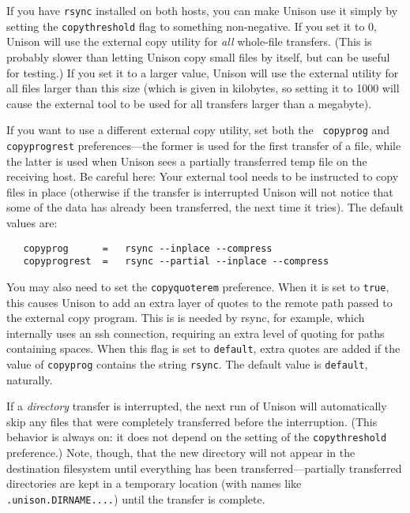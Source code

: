 \documentclass{article}
\begin{document}
If you have {\tt rsync} installed on both hosts, you can make Unison use it
simply by setting the {\tt copythreshold} flag to something non-negative.
If you set it to 0, Unison will use the external copy utility for {\em all}
whole-file transfers.  (This is probably slower than letting Unison copy
small files by itself, but can be useful for testing.)  If you set it to a
larger value, Unison will use the external utility for all files larger than
this size (which is given in kilobytes, so setting it to 1000 will cause the
external tool to be used for all transfers larger than a megabyte).

If you want to use a different external copy utility, set both the {\tt
  copyprog} and {\tt copyprogrest} preferences---the former is used for
the first transfer of a file, while the latter is used when Unison sees a
partially transferred temp file on the receiving host.  Be careful here:
Your external tool needs to be instructed to copy files in place (otherwise
if the transfer is interrupted Unison will not notice that some of the data
has already been transferred, the next time it tries).  The default values
are:
\begin{verbatim}
   copyprog      =   rsync --inplace --compress
   copyprogrest  =   rsync --partial --inplace --compress
\end{verbatim}
You may also need to set the {\tt copyquoterem} preference.  When it is set
to {\tt true}, this causes Unison to add an extra layer of quotes to
the remote path passed to the external copy program. This is is needed by
rsync, for example, which internally uses an ssh connection, requiring an
extra level of quoting for paths containing spaces. When this flag is set to
{\tt default}, extra quotes are added if the value of {\tt copyprog}
contains the string {\tt rsync}.  The default value is {\tt default},
naturally.

If a {\em directory} transfer is interrupted, the next run of Unison will
automatically skip any files that were completely transferred before the
interruption.  (This behavior is always on: it does not depend on the
setting of the {\tt copythreshold} preference.)  Note, though, that the new
directory will not appear in the destination filesystem until everything has
been transferred---partially transferred directories are kept in a temporary
location (with names like {\tt .unison.DIRNAME....}) until the transfer is
complete.


\end{document}
